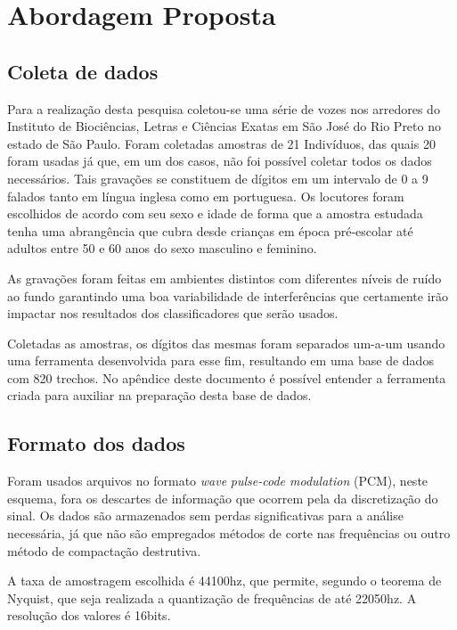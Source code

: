 \chapter{Abordagem Proposta} \label{chap:propApproach}
	\begin{myenv}{1.5}
		\section{Coleta de dados}
			\par Para a realização desta pesquisa coletou-se uma série de vozes nos arredores do Instituto de Biociências, Letras e Ciências Exatas em São José do Rio Preto no estado de São Paulo. Foram coletadas amostras de 21 Indivíduos, das quais 20 foram usadas já que, em um dos casos, não foi possível coletar todos os dados necessários. Tais gravações se constituem de dígitos em um intervalo de 0 a 9 falados tanto em língua inglesa como em portuguesa. Os locutores foram escolhidos de acordo com seu sexo e idade de forma que a amostra estudada tenha uma abrangência que cubra desde crianças em época pré-escolar até adultos entre 50 e 60 anos do sexo masculino e feminino.
						
			\par As gravações foram feitas em ambientes distintos com diferentes níveis de ruído ao fundo garantindo uma boa variabilidade de interferências que certamente irão impactar nos resultados dos classificadores que serão usados.
			
			\par Coletadas as amostras, os dígitos das mesmas foram separados um-a-um usando uma ferramenta desenvolvida para esse fim, resultando em uma base de dados com 820 trechos. No apêndice deste documento é possível entender a ferramenta criada para auxiliar na preparação desta base de dados.
			
		\section{Formato dos dados}
			\par Foram usados arquivos no formato \textit{wave} \textit{pulse-code modulation} (PCM), neste esquema, fora os descartes de informação que ocorrem pela da discretização do sinal. Os dados são armazenados sem perdas significativas para a análise necessária, já que não são empregados métodos de corte nas frequências ou outro método de compactação destrutiva.
			
			\par A taxa de amostragem escolhida é 44100hz, que permite, segundo o teorema de Nyquist, que seja realizada a quantização de frequências de até 22050hz. A resolução dos valores é 16bits.
			

\end{myenv}
